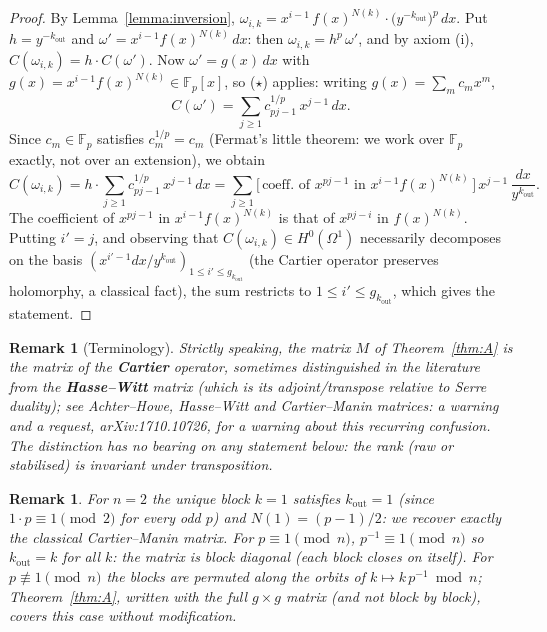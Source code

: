 \documentclass[11pt,a4paper]{article}
\newtheorem{remark}[theorem]{Remark}
\newcommand{\F}{\mathbb{F}}
\begin{document}
\begin{proof}
By Lemma~\ref{lemma:inversion}, $\omega_{i,k}=x^{i-1}\,f(x)^{N(k)}\cdot
\big(y^{-k_{\mathrm{out}}}\big)^p\,dx$. Put $h=y^{-k_{\mathrm{out}}}$ and
$\omega'=x^{i-1} f(x)^{N(k)}\,dx$: then $\omega_{i,k}=h^p\,\omega'$, and by axiom
(i), $C(\omega_{i,k})=h\cdot C(\omega')$. Now $\omega'=g(x)\,dx$ with
$g(x)=x^{i-1} f(x)^{N(k)}\in\F_p[x]$, so ($\star$) applies: writing
$g(x)=\sum_m c_m x^m$,
$$C(\omega')=\sum_{j\ge1}c_{pj-1}^{1/p}\,x^{j-1}\,dx.$$
Since $c_m\in\F_p$ satisfies $c_m^{1/p}=c_m$ (Fermat's little theorem: we work
over $\F_p$ exactly, not over an extension), we obtain
$$C(\omega_{i,k})=h\cdot\sum_{j\ge1}c_{pj-1}^{1/p}\,x^{j-1}\,dx
=\sum_{j\ge1}\big[\,\text{coeff.\ of }x^{pj-1}\text{ in } x^{i-1}f(x)^{N(k)}\,\big]\,
x^{j-1}\,\frac{dx}{y^{k_{\mathrm{out}}}}.$$
The coefficient of $x^{pj-1}$ in $x^{i-1}f(x)^{N(k)}$ is that of $x^{pj-i}$ in
$f(x)^{N(k)}$. Putting $i'=j$, and observing that $C(\omega_{i,k})\in
H^0(\Omega^1)$ necessarily decomposes on the basis
$(x^{i'-1}dx/y^{k_{\mathrm{out}}})_{1\le i'\le g_{k_{\mathrm{out}}}}$ (the Cartier
operator preserves holomorphy, a classical fact), the sum restricts to
$1\le i'\le g_{k_{\mathrm{out}}}$, which gives the statement.
\end{proof}

\begin{remark}[Terminology]
Strictly speaking, the matrix $M$ of Theorem~\ref{thm:A} is the matrix of the
\textbf{Cartier} operator, sometimes distinguished in the literature from the
\textbf{Hasse--Witt} matrix (which is its adjoint/transpose relative to Serre
duality); see Achter--Howe, \emph{Hasse--Witt and Cartier--Manin matrices: a
warning and a request}, arXiv:1710.10726, for a warning about this recurring
confusion. The distinction has no bearing on any statement below: the rank (raw
or stabilised) is invariant under transposition.
\end{remark}

\begin{remark}
For $n=2$ the unique block $k=1$ satisfies $k_{\mathrm{out}}=1$ (since
$1\cdot p\equiv1\pmod2$ for every odd $p$) and $N(1)=(p-1)/2$: we recover exactly
the classical Cartier--Manin matrix. For $p\equiv1\pmod n$, $p^{-1}\equiv1\pmod n$
so $k_{\mathrm{out}}=k$ for all $k$: the matrix is block diagonal (each block
closes on itself). For $p\not\equiv1\pmod n$ the blocks are permuted along the
orbits of $k\mapsto k\,p^{-1}\bmod n$; Theorem~\ref{thm:A}, written with the full
$g\times g$ matrix (and not block by block), covers this case without
modification.
\end{remark}
\end{document}

